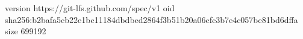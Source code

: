 version https://git-lfs.github.com/spec/v1
oid sha256:b2bafa5cb22e1bc11184dbdbed2864f3b51b20a06cfc3b7e4c057be81bd6dffa
size 699192
